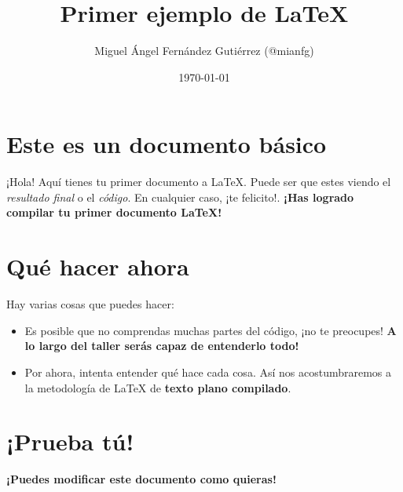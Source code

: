 \documentclass[11pt, a4paper]{article}
\title{\textbf{Primer ejemplo de \LaTeX{}}}
\author{Miguel Ángel Fernández Gutiérrez (@mianfg)}
\date{\today}
\begin{document}
\maketitle

\section{Este es un documento básico}

¡Hola! Aquí tienes tu primer documento a \LaTeX{}. Puede ser que estes viendo el \emph{resultado final} o el \emph{código}. En cualquier caso, ¡te felicito!. \textbf{¡Has logrado compilar tu primer documento \LaTeX{}!}

\section{Qué hacer ahora}

Hay varias cosas que puedes hacer:

\begin{itemize}
	\item Es posible que no comprendas muchas partes del código, ¡no te preocupes! \textbf{A lo largo del taller serás capaz de entenderlo todo!}
	\item Por ahora, intenta entender qué hace cada cosa. Así nos acostumbraremos a la metodología de \LaTeX{} de \textbf{texto plano compilado}.
\end{itemize}

\section{¡Prueba tú!}

\textbf{¡Puedes modificar este documento como quieras!}
\end{document}

